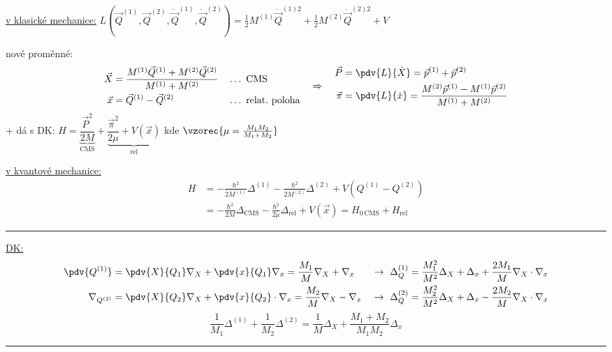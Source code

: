 \begin{priklad}
\underline{v klasické mechanice:} \quad
$L(\vec Q^{(1)},\vec Q^{(2)},\dot{\vec Q}^{(1)},\dot{\vec Q}^{(2)}) = \frac12M^{(1)}\dot{\vec Q}^{(1)2} + \frac12M^{(2)}\dot{\vec Q}^{(2)2} + V$

nové proměnné:
\[
  \begin{aligned}
    \vec X &= \frac{M^{(1)}\vec Q^{(1)} + M^{(2)}\vec Q^{(2)}}{M^{(1)} + M^{(2)}} &&\dots\ \text{CMS} \\
    \vec x &= \vec Q^{(1)} - \vec Q^{(2)} &&\dots\ \text{relat.\ poloha}
  \end{aligned}
  \quad\Rightarrow\quad
  \begin{aligned}
    \vec P &= \pdv{L}{\dot X} = \vec p^{(1)} + \vec p^{(2)} \\
    \vec\pi &= \pdv{L}{\dot x} = \frac{M^{(2)}\vec p^{(1)} - M^{(1)}\vec p^{(2)}}{M^{(1)} + M^{(2)}}
  \end{aligned}
\]
+ dá s DK: \quad
$H = \underbrace{\dfrac{\vec P^2}{2M}}_{\text{CMS}} + \boxed{\underbrace{\dfrac{\vec\pi^2}{2\mu} + V(\vec x)}_{\text{rel}}}$ \quad kde \quad $\vzorec{\mu = \frac{M_1M_2}{M_1 + M_2}}$

\underline{v kvantové mechanice:}
\begin{align*}
  H &= -\frac{\hbar^2}{2M^{(1)}}\Delta^{(1)} - \frac{\hbar^2}{2M^{(2)}}\Delta^{(2)} + V(Q^{(1)} - Q^{(2)}) \\
  &= -\frac{\hbar^2}{2M}\Delta_{\text{CMS}} - \frac{\hbar^2}{2\mu}\Delta_{\text{rel}} + V(\vec x) = H_{0\,\text{CMS}} + H_{\text{rel}}
\end{align*}
\rule{\linewidth}{0.3pt}
\underline{DK:}
\begin{align*}
  \pdv{Q^{(1)}} &= \pdv{X}{Q_1}\nabla_X + \pdv{x}{Q_1}\nabla_x = \frac{M_1}{M}\nabla_X + \nabla_x
  &&\to\ \Delta_Q^{(1)} = \frac{M_1^2}{M^2}\Delta_X + \Delta_x + \frac{2M_1}{M}\nabla_X\cdot\nabla_x \\
  \nabla_{Q^{(2)}} &= \pdv{X}{Q_2}\nabla_X + \pdv{x}{Q_2}\cdot\nabla_x = \frac{M_2}{M}\nabla_X - \nabla_x
  &&\to\ \Delta_Q^{(2)} = \frac{M_2^2}{M^2}\Delta_X + \Delta_x - \frac{2M_2}{M}\nabla_X\cdot\nabla_x
\end{align*}
\[
  \frac{1}{M_1}\Delta^{(1)} + \frac{1}{M_2}\Delta^{(2)} = \frac1M\Delta_X + \frac{M_1 + M_2}{M_1M_2}\Delta_x
\]
\rule{\linewidth}{0.3pt}


\end{priklad}
